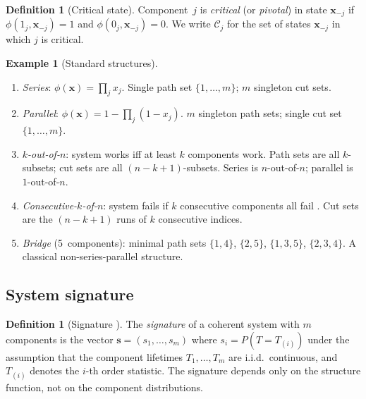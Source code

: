 \documentclass[12pt]{article}
\theoremstyle{definition}
\newtheorem{definition}[theorem]{Definition}
\newtheorem{example}[theorem]{Example}
\theoremstyle{remark}
\begin{document}
\begin{definition}[Critical state]
\label{def:critical}
Component~$j$ is \emph{critical} (or \emph{pivotal}) in state
$\mathbf{x}_{-j}$ if
$\phi(1_j, \mathbf{x}_{-j}) = 1$ and $\phi(0_j, \mathbf{x}_{-j}) = 0$.
We write $\mathcal{C}_j$ for the set of states $\mathbf{x}_{-j}$ in
which $j$ is critical.
\end{definition}

\begin{example}[Standard structures]\label{ex:structures}
\begin{enumerate}[label=(\alph*)]
  \item \emph{Series}: $\phi(\mathbf{x}) = \prod_j x_j$.
    Single path set $\{1, \ldots, m\}$; $m$ singleton cut sets.
  \item \emph{Parallel}: $\phi(\mathbf{x}) = 1 - \prod_j(1 - x_j)$.
    $m$ singleton path sets; single cut set $\{1, \ldots, m\}$.
  \item \emph{$k$-out-of-$n$}: system works iff at least $k$ components
    work.  Path sets are all $k$-subsets; cut sets are all
    $(n - k + 1)$-subsets.  Series is $n$-out-of-$n$; parallel is
    $1$-out-of-$n$.
  \item \emph{Consecutive-$k$-of-$n$}: system fails if $k$ consecutive
    components all fail \citep{ChiangNiu1981}.  Cut sets are the
    $(n - k + 1)$ runs of $k$ consecutive indices.
  \item \emph{Bridge} (5~components): minimal path sets
    $\{1,4\}$, $\{2,5\}$, $\{1,3,5\}$, $\{2,3,4\}$.  A classical
    non-series-parallel structure.
\end{enumerate}
\end{example}

\subsection{System signature}
\label{sec:signature}

\begin{definition}[Signature {\citep{Samaniego1985}}]
\label{def:signature}
The \emph{signature} of a coherent system with $m$ components is the
vector $\mathbf{s} = (s_1, \ldots, s_m)$ where
$s_i = P(T = T_{(i)})$ under the assumption that the component
lifetimes $T_1, \ldots, T_m$ are i.i.d.\ continuous, and $T_{(i)}$
denotes the $i$-th order statistic.  The signature depends only on
the structure function, not on the component distributions.
\end{definition}
\end{document}
